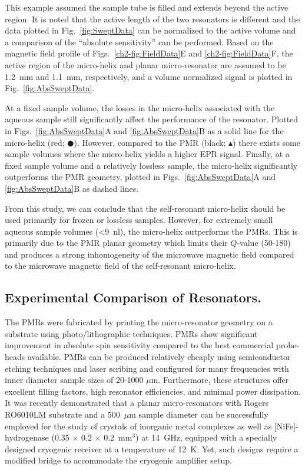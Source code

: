This example assumed the sample tube is filled and extends beyond the active region. It is noted that the active length of the two resonators is different and the data plotted in Fig.~\ref{fig:SweptData} can be normalized to the active volume and a comparison of the ``absolute sensitivity'' can be performed. Based on the magnetic field profile of  Figs.~\ref{ch2-fig:FieldData}E and \ref{ch2-fig:FieldData}F, the active region of the micro-helix and planar micro-resonator are assumed to be 1.2~mm and 1.1~mm, respectively, and a volume normalized signal is plotted in Fig.~\ref{fig:AbsSweptData}. 

At a fixed sample volume, the losses in the micro-helix associated with the aqueous sample still significantly affect the performance of the resonator.  Plotted in Figs.~\ref{fig:AbsSweptData}A and \ref{fig:AbsSweptData}B as a solid line for the micro-helix (red; $\CIRCLE$). However, compared to the PMR (black; $\blacktriangle$) there exists some sample volumes where the micro-helix yields a higher EPR signal. Finally, at a fixed sample volume and a relatively lossless sample, the micro-helix significantly outperforms the PMR geometry, plotted in Figs.~\ref{fig:AbsSweptData}A and \ref{fig:AbsSweptData}B as dashed lines.

From this study, we can conclude that the self-resonant micro-helix should be used primarily for frozen or lossless samples. However, for extremely small aqueous sample volumes (<9~nl), the micro-helix outperforms the PMRs. This is primarily due to the PMR planar geometry which limits their $Q$-value (50-180) and produces a strong inhomogeneity of the microwave magnetic field compared to the microwave magnetic field of the self-resonant micro-helix. 

\subsection{Experimental Comparison of Resonators.}
The PMRs were fabricated by printing the micro-resonator geometry on a substrate using photo\-/lithographic techniques. \cite{Suter2005, Suter2008, suter2015} PMRs show significant improvement in absolute spin sensitivity compared to the best commercial probe-heads available. \cite{ ReijerseSavitsky2017} PMRs can be produced relatively cheaply using semiconductor etching techniques and laser scribing and configured for many frequencies with inner diameter sample sizes of 20-1000 $\mu$m. Furthermore, these structures offer excellent filling factors, high resonator efficiencies, and minimal power dissipation. It was recently demonstrated that a planar micro-resonators with Rogers RO6010LM substrate and a 500~$\mu$m sample diameter can be successfully employed for the study of crystals of inorganic metal complexes as well as [NiFe]-hydrogenase (0.35 $\times$ 0.2 $\times$ 0.2~mm$^3$) at 14~GHz, equipped with a specially designed cryogenic receiver at a temperature of 12~K. \cite{NARKOWICZ201379} Yet, such designs require a modified bridge to accommodate the cryogenic amplifier setup.

